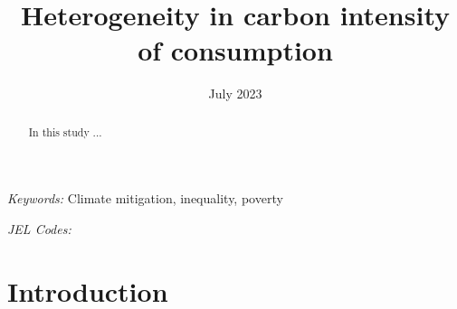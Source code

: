 \documentclass[12pt, a4paper]{article}
\title{Heterogeneity in carbon intensity of consumption}
\date{July 2023}
\begin{document}
\maketitle
\begin{abstract}
  In this study ...
\end{abstract}

\smallskip

\noindent \small \textit{Keywords:} Climate mitigation, inequality, poverty

\noindent \small \textit{JEL Codes:}

\thispagestyle{empty}
\clearpage
\setcounter{page}{1}

\section{Introduction} \label{sec:introduction}
\end{document}
